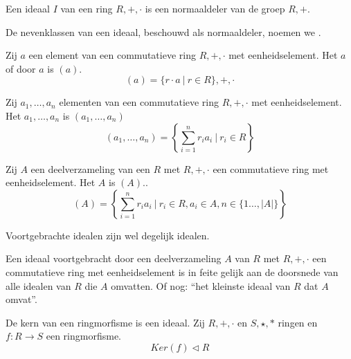 \documentclass[main.tex]{subfiles}
\begin{document}
\begin{ei}
  Een ideaal $I$ van een ring $R,+,\cdot$ is een normaaldeler van de groep $R,+$.
\end{ei}

\begin{de}
  De nevenklassen van een ideaal, beschouwd als normaaldeler, noemen we .
\end{de}


\begin{de}
  Zij $a$ een element van een commutatieve ring $R,+,\cdot$ met eenheidselement.
  Het  $a$ of  door $a$ is $(a)$.
  \[ (a) = \{r \cdot a \ |\ r \in R \},+,\cdot \]
\end{de}

\begin{de}
  Zij $a_{1},\dotsc,a_{n}$ elementen van een commutatieve ring $R,+,\cdot$ met eenheidselement.
  Het  $a_{1},\dotsc,a_{n}$ is $(a_{1},\dotsc,a_{n})$
  \[ (a_{1},\dotsc,a_{n}) = \left\{ \sum_{i=1}^{n}r_{i}a_{i} \ |\ r_{i} \in R \right\} \]
\end{de}

\begin{de}
  Zij $A$ een deelverzameling van een $R$ met $R,+,\cdot$ een commutatieve ring met eenheidselement.
  Het  $A$ is $(A)$..
  \[ (A) = \left\{ \sum_{i=1}^{n}r_{i}a_{i} \ |\ r_{i} \in R, a_{i} \in A, n\in \{1 \dotsc, |A|\} \right\}\]
\end{de}

\begin{st}
  Voortgebrachte idealen zijn wel degelijk idealen.
\end{st}

\begin{opm}
  Een ideaal voortgebracht door een deelverzameling $A$ van $R$ met $R,+,\cdot$ een commutatieve ring met eenheidselement is in feite gelijk aan de doorsnede van alle idealen van $R$ die $A$ omvatten.
  Of nog: ``het kleinste ideaal van $R$ dat $A$ omvat''.
\end{opm}


\begin{pr}
  De kern van een ringmorfisme is een ideaal.
  Zij $R,+,\cdot$ en $S,\star,*$ ringen en $f: R\rightarrow S$ een ringmorfisme.
  \[ Ker(f) \triangleleft R \]
\end{pr}
\end{document}
